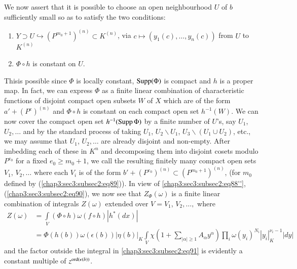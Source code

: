 We now assert that it is possible to choose an open neighbourhood $U$
of $b$ sufficiently small so as to satisfy the two conditions:
\begin{enumerate}
\renewcommand{\theenumi}{\roman{enumi}}
\renewcommand{\labelenumi}{(\theenumi)}
\item $Y\supset U\hookrightarrow (P^{m_{0}+1})^{(n)}\subset K^{(n)}$,
  via $c\mapsto (y_{1}(c),\ldots,y_{n}(c))$ from $U$ to $K^{(n)}$

\item $\Phi\circ h$ is constant on $U$.
\end{enumerate}
This\pageoriginale is possible since $\Phi$ is locally constant,
$\operatorname{Supp}(\Phi)$ is compact and $h$ is a proper map. In fact, we can
express $\Phi$ as a finite linear combination of characteristic
functions of disjoint compact open subsets $W$ of $X$ which are of the
form $a'+(P^{e})^{(n)}$ and $\Phi\circ h$ is constant on each compact
open set $h^{-1}(W)$. We can now cover the compact open set
$h^{-1}(\operatorname{Supp}\Phi)$ by a finite number of $U$'s, say $U_{1}$,
$U_{2},\ldots$ and by the standard process of taking $U_{1}$,
$U_{2}\backslash U_{1}$, $U_{3}\backslash (U_{1}\cup U_{2})$, etc., we
may assume that $U_{1}$, $U_{2},\ldots$ are already disjoint and
non-empty. After imbedding each of these in $K^{n}$ and decomposing
them into disjoint cosets modulo $P^{e_{0}}$ for a fixed $e_{0}\geq
m_{0}+1$, we call the resulting finitely many compact open sets
$V_{1}$, $V_{2},\ldots$ where each $V_{i}$ is of the form
$b'+(P^{e_{0}})^{(n)}\subset (P^{m_{0}+1})^{(n)}$, (for $m_{0}$
defined by (\ref{chap3:sec3:subsec2:eq89})). In view
of \ref{chap3:sec3:subsec2:eq88''}, (\ref{chap3:sec3:subsec2:eq90}), we now see
that $Z_{\Phi}(\omega)$ is a finite linear combination of integrals
$Z(\omega)$ extended over $V=V_{1}$, $V_{2},\ldots,$ where
\begin{align*}
  Z(\omega) &= \int\limits_{V}(\Phi\circ h)\omega(f\circ
  h)|h^{\ast}(dx)|\\
  &=\Phi(h(b))\omega(\epsilon(b))|\eta(b)|_{K}\int\limits_{V}
  \chi\left(1+\sum_{|\alpha|\geq
    1}A_{\alpha}y^{\alpha}\right)\prod_{i}\omega(y_{i})^{N_{i}}
  |y_{i}|^{\nu_{i}-1}_{K}|dy|\tag{91}\label{chap3:sec3:subsec2:eq91}
\end{align*}
and the factor outside the integral in \ref{chap3:sec3:subsec2:eq91}
is evidently a constant multiple of $z^{\operatorname{ord}(\epsilon(b))}$.

\subsection{}\label{chap3:sec3:subsec3} %

